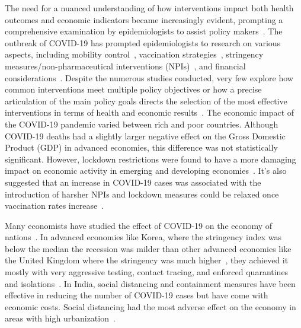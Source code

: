 \documentclass[tikz,fleqn,12pt]{wlscirep}
\begin{document}
The need for a nuanced understanding of how interventions impact both health outcomes and economic indicators became increasingly evident, prompting a comprehensive examination by epidemiologists to assist policy makers~\cite{Anderson2020}. The outbreak of COVID-19 has prompted epidemiologists to research on various aspects, including mobility control~\cite{Song2022,Chinazzi2020}, vaccination strategies~\cite{Nguyen2021, Kim2022}, stringency measures/non-pharmaceutical interventions (NPIs)~\cite{Jalloh2022,Caldwell2021,Ferguson2020}, and financial considerations~\cite{DeFoo2023}. Despite the numerous studies conducted, very few explore how common interventions meet multiple policy objectives or how a precise articulation of the main policy goals directs the selection of the most effective interventions in terms of health and economic results~\cite{Hollingsworth2011, Song2022,Pangallo2023,Ash2022,Ohi2020, PADMANABHAN2021102676,NBERw26981,analytical_covid_lockdown_model}. The economic impact of the COVID-19 pandemic varied between rich and poor countries. Although COVID-19 deaths had a slightly larger negative effect on the Gross Domestic Product (GDP) in advanced economies, this difference was not statistically significant. However, lockdown restrictions were found to have a more damaging impact on economic activity in emerging and developing economies~\cite{Gagnon2023,Redlin2022,Liang2021}. It's also suggested that an increase in COVID-19 cases was associated with the introduction of harsher NPIs and lockdown measures could be relaxed once vaccination rates increase~\cite{Redlin2022,Patel2021}.

Many economists have studied the effect of COVID-19 on the economy of nations~\cite{Gagnon2023,GagnonKorea,Deb2020,Eichenbaum2021}. In advanced economies like Korea, where the stringency index was below the median the recession was milder than other advanced economies like the United Kingdom where the stringency was much higher~\cite{GagnonKorea}, they achieved it mostly with very aggressive testing, contact tracing, and enforced quarantines and isolations~\cite{Lim2023,KoreaMinister}. In India, social distancing and containment measures have been effective in reducing the number of COVID-19 cases but have come with economic costs. Social distancing had the most adverse effect on the economy in areas with high urbanization~\cite{Deb2020}.
\end{document}
